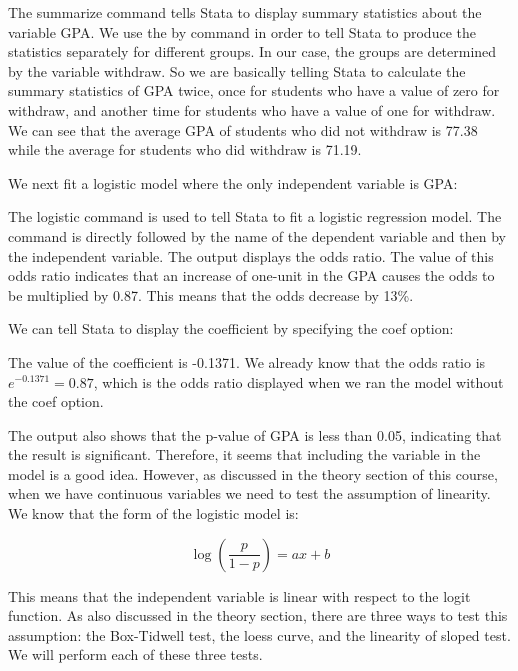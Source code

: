 \documentclass[a4paper,12pt,oneside]{book}
\begin{document}
The summarize command tells Stata to display summary statistics about the variable GPA. We use the by command in order to tell Stata to produce the statistics separately for different groups. In our case, 
the groups are determined by the variable withdraw. So we are basically telling Stata to calculate the summary statistics of GPA twice, once for students who have a value of zero for withdraw, and another 
time for students who have a value of one for withdraw. We can see that the average GPA of students who did not withdraw is 77.38 while the average 
for students who did withdraw is 71.19.

We next fit a logistic model where the only independent variable is GPA:

\begin{stlog}\end{stlog}

The logistic command is used to tell Stata to fit a logistic regression model. The command is directly followed by the name of the dependent variable and then by the independent variable. 
The output displays the odds ratio. The value of this odds ratio indicates that an increase of one-unit in the GPA causes the odds to be multiplied by 0.87. This means that the odds decrease by 13\%.

We can tell Stata to display the coefficient by specifying the coef option:

\begin{stlog}\end{stlog}

The value of the coefficient is -0.1371. We already know that the odds ratio is $e^{-0.1371}=0.87$, which is the odds ratio displayed when we ran the model without the coef option.

The output also shows that the p-value of GPA is less than 0.05, indicating that the result is significant. Therefore, it seems that including the variable in the model is a good idea. However, as 
discussed in the theory section of this course, when we have continuous variables we need to test the assumption of linearity. We know that the form of the logistic model is:

$$ \log(\frac{p}{1-p})=ax+b $$

This means that the independent variable is linear with respect to the logit function. As also discussed in the theory section, there are three ways to test this assumption: the Box-Tidwell test, 
the loess curve, and the linearity of sloped test. We will perform each of these three tests.
\end{document}
